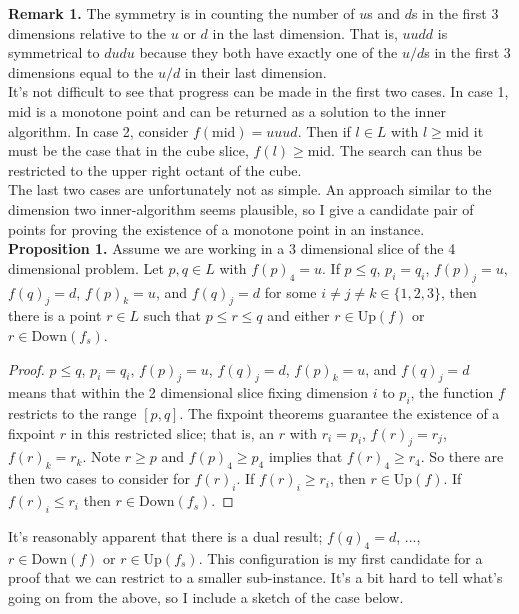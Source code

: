 \documentclass{article}
\newcommand{\mi}{\text{mid}}
\newcommand{\up}{\text{Up}}
\newcommand{\down}{\text{Down}}
\begin{document}
  \newpage

  \textbf{Remark 1.} The symmetry is in counting the number of $u$s and $d$s in the first 3
  dimensions relative to the $u$ or $d$ in the last dimension. That is, $uudd$ is symmetrical to
  $dudu$ because they both have exactly one of the $u/d$s in the first 3 dimensions equal to the $u/d$ in
  their last dimension. \\

  It's not difficult to see that progress can be made in the first two cases. In case 1,
  $\mi$ is a monotone point and can be returned as a solution to the inner algorithm. In case 2,
  consider $f(\mi) = uuud$. Then if $l \in L$ with $l \geq \mi$ it must be the case that
  in the cube slice, $f(l) \geq \mi$. The search can thus be restricted to the upper right
  octant of the cube. \\

  The last two cases are unfortunately not as simple. An approach similar to the dimension two
  inner-algorithm seems plausible, so I give a candidate pair of points for proving
  the existence of a monotone point in an instance. \\

  \textbf{Proposition 1.} Assume we are working in a 3 dimensional slice of the 4 dimensional problem.
  Let $p, q \in L$ with $f(p)_4 = u$. If $p \leq q$, $p_i = q_i$, 
  $f(p)_j = u$, $f(q)_j = d$, $f(p)_k = u$, and $f(q)_j = d$ for some $i \neq j \neq k \in \{1, 2, 3\}$,
  then there is a point $r \in L$ such that $p \leq r \leq q$ and either $r \in \up(f)$ or $r \in \down(f_s)$.

  \begin{proof}
    $p \leq q$, $p_i = q_i$, $f(p)_j = u$, $f(q)_j = d$, $f(p)_k = u$, and $f(q)_j = d$ means that
    within the 2 dimensional slice fixing dimension $i$ to $p_i$, the function $f$ restricts to
    the range $[p, q]$. The fixpoint theorems guarantee the existence of a fixpoint $r$ in this
    restricted slice; that is, an $r$ with $r_i = p_i$, $f(r)_j = r_j$, $f(r)_k = r_k$. Note
    $r \geq p$ and $f(p)_4 \geq p_4$ implies that $f(r)_4 \geq r_4$. So there are then two cases to consider
    for $f(r)_i$. If $f(r)_i \geq r_i$, then $r \in \up(f)$. If $f(r)_i \leq r_i$ then $r \in \down(f_s)$.
  \end{proof}

  It's reasonably apparent that there is a dual result; $f(q)_4 = d$, ..., $r \in \down(f)$
  or $r \in \up(f_s)$. This configuration is my first candidate for a proof that we can restrict to a smaller
  sub-instance. It's a bit hard to tell what's going on from the above, so I include a sketch of the case below.
  
\end{document}
